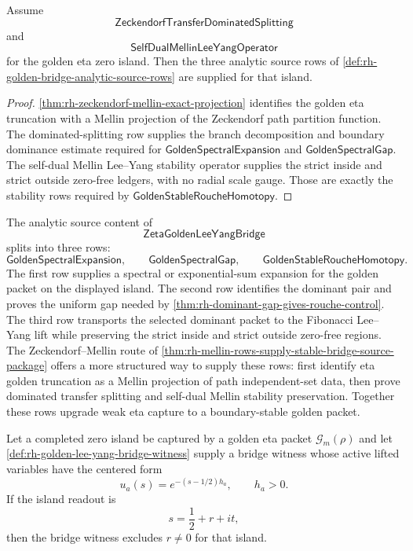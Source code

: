\begin{theorem}
\label{thm:rh-mellin-rows-supply-stable-bridge-source-package}
Assume
$$
\mathsf{ZeckendorfTransferDominatedSplitting}
$$
and
$$
\mathsf{SelfDualMellinLeeYangOperator}
$$
for the golden eta zero island.  Then the three analytic source rows of
\autoref{def:rh-golden-bridge-analytic-source-rows} are supplied for
that island.
\end{theorem}

\begin{proof}
\autoref{thm:rh-zeckendorf-mellin-exact-projection} identifies the
golden eta truncation with a Mellin projection of the Zeckendorf path
partition function.  The dominated-splitting row supplies the branch
decomposition and boundary dominance estimate required for
$\mathsf{GoldenSpectralExpansion}$ and
$\mathsf{GoldenSpectralGap}$.  The self-dual Mellin Lee--Yang stability
operator supplies the strict inside and strict outside zero-free
ledgers, with no radial scale gauge.  Those are exactly the stability
rows required by $\mathsf{GoldenStableRoucheHomotopy}$.
\end{proof}

\begin{definition}
\label{def:rh-golden-bridge-analytic-source-rows}
The analytic source content of
$$
\mathsf{ZetaGoldenLeeYangBridge}
$$
splits into three rows:
$$
\mathsf{GoldenSpectralExpansion},
\qquad
\mathsf{GoldenSpectralGap},
\qquad
\mathsf{GoldenStableRoucheHomotopy}.
$$
The first row supplies a spectral or exponential-sum expansion for the
golden packet on the displayed island.  The second row identifies the
dominant pair and proves the uniform gap needed by
\autoref{thm:rh-dominant-gap-gives-rouche-control}.  The third row
transports the selected dominant packet to the Fibonacci Lee--Yang lift
while preserving the strict inside and strict outside zero-free regions.
The Zeckendorf--Mellin route of
\autoref{thm:rh-mellin-rows-supply-stable-bridge-source-package}
offers a more structured way to supply these rows: first identify eta
golden truncation as a Mellin projection of path independent-set data,
then prove dominated transfer splitting and self-dual Mellin stability
preservation.  Together these rows upgrade weak eta capture to a
boundary-stable golden packet.
\end{definition}

\begin{theorem}
\label{thm:rh-golden-bridge-witness-supplies-boundary-stability}
Let a completed zero island be captured by a golden eta packet
$\mathcal G_m(\rho)$ and let
\autoref{def:rh-golden-lee-yang-bridge-witness} supply a bridge witness
whose active lifted variables have the centered form
$$
u_a(s)=e^{-(s-1/2)h_a},
\qquad
h_a>0.
$$
If the island readout is
$$
s=\frac12+r+it,
$$
then the bridge witness excludes $r\ne0$ for that island.
\end{theorem}


